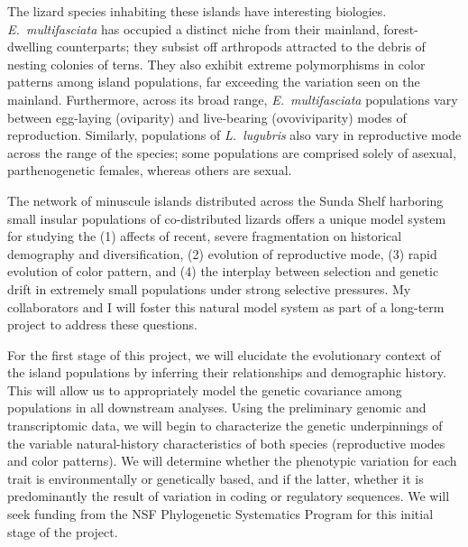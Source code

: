 The lizard species inhabiting these islands have interesting biologies.
\emph{E.\ multifasciata} has occupied a distinct niche from their mainland,
forest-dwelling counterparts; they subsist off arthropods attracted to the
debris of nesting colonies of terns.
They also exhibit extreme polymorphisms in color patterns among island
populations, far exceeding the variation seen on the mainland.
Furthermore, across its broad range, \emph{E.\ multifasciata} populations vary
between egg-laying (oviparity) and live-bearing (ovoviviparity) modes of
reproduction.
Similarly, populations of \emph{L.\ lugubris} also vary in reproductive mode
across the range of the species; some populations are comprised solely of
asexual, parthenogenetic females, whereas others are sexual.

The network of minuscule islands distributed across the Sunda Shelf harboring
small insular populations of co-distributed lizards offers a unique model
system for studying the 
(1) affects of recent, severe fragmentation on historical demography and
diversification,
(2) evolution of reproductive mode,
(3) rapid evolution of color pattern, and 
(4) the interplay between selection and genetic drift in extremely small
populations under strong selective pressures.
My collaborators and I will foster this natural model system as part of a
long-term project to address these questions.

For the first stage of this project, we will elucidate the evolutionary context
of the island populations by inferring their relationships and demographic
history.
This will allow us to appropriately model the genetic covariance among
populations in all downstream analyses.
Using the preliminary genomic and transcriptomic data, we will begin to
characterize the genetic underpinnings of the variable natural-history
characteristics of both species (reproductive modes and color patterns).
We will determine whether the phenotypic variation for each trait is
environmentally or genetically based, and if the latter, whether it is
predominantly the result of variation in coding or regulatory sequences.
We will seek funding from the NSF Phylogenetic Systematics Program for this
initial stage of the project.


